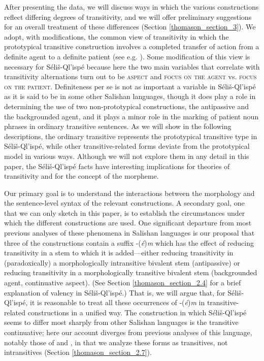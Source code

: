 \documentclass[output=paper,colorlinks,citecolor=brown]{langscibook}
\begin{document}
  After presenting the data, we will discuss ways in which the
  various constructions reflect differing degrees of transitivity,
  and we will offer preliminary suggestions for an overall treatment
  of these differences (Section \ref{thomason_section_3}).  We adopt, with modifications, the
  common view of transitivity in which the prototypical transitive
  construction involves a completed transfer of action from a
  definite agent to a definite patient (see
  e.g. \citealt{Hopper&Thompson:1980}).  Some modification of this view is
  necessary for
  S\'eli\v{s}-Ql'isp\'e because here the two main variables that
  correlate with transitivity alternations turn out to be \textsc{aspect} and \textsc{focus on the agent} vs. \textsc{focus on the
    patient}.  Definiteness per se is not as important a variable in
  S\'eli\v{s}-Ql'isp\'e as it is said to be in some other Salishan
  languages, though it does play a role in determining the use of two
  non-prototypical constructions, the antipassive and the
  backgrounded agent, and it plays a minor role in the marking of
  patient noun phrases in ordinary transitive sentences.  As we will
  show in the following descriptions, the ordinary transitive
  represents the prototypical transitive type in
  S\'eli\v{s}-Ql'isp\'e, while other transitive-related forms deviate
  from the prototypical model in various ways.  Although we will not
  explore them in any detail in this paper, the S\'eli\v{s}-Ql'isp\'e
  facts have interesting implications for theories of transitivity
  and for the concept of the morpheme.

  Our primary goal is to understand the interactions between the
  morphology and the sentence-level syntax of the relevant
  constructions.  A secondary goal, one that we can only sketch in
  this paper, is to establish the circumstances under which the
  different constructions are used.  One significant departure from
  most previous analyses of these phenomena in Salishan languages is
  our proposal that three of the constructions contain a suffix
  -(\emph{\'e})\emph{m} which has the effect of reducing transitivity
  in a stem to which it is added---either reducing transitivity in
  (paradoxically) a morphologically intransitive bivalent stem
  (antipassive) or reducing transitivity in a morphologically
  transitive bivalent stem (backgrounded agent, continuative aspect).
  (See Section \ref{thomason_section_2.4} for a brief explanation of valency in
  S\'eli\v{s}-Ql'isp\'e.) That is, we will argue that, for
  S\'eli\v{s}-Ql'isp\'e, it is reasonable to treat all these
  occurrences of -(\emph{\'e})\emph{m} in transitive-related
  constructions in a unified way.  The construction in which
  S\'eli\v{s}-Ql'isp\'e seems to differ most sharply from other
  Salishan languages is the transitive continuative; here our account
  diverges from previous analyses of this language, notably those of
  \citet{Kroeber:1999} and \citet{Vogt:1940}, in
  that we analyze these
  forms as transitives, not intransitives (Section \ref{thomason_section_2.7}).
\end{document}
